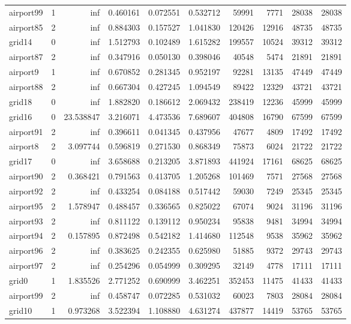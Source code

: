 \documentclass[../../../thesis.tex]{subfiles}
\begin{document}
\begin{longtable}{|l|r|r|r|r|r|r|r|r|r|}
airport99 & 1 & inf & 0.460161 & 0.072551 & 0.532712 & 59991 & 7771 & 28038 & 28038 \\
airport85 & 2 & inf & 0.884303 & 0.157527 & 1.041830 & 120426 & 12916 & 48735 & 48735 \\
grid14 & 0 & inf & 1.512793 & 0.102489 & 1.615282 & 199557 & 10524 & 39312 & 39312 \\
airport87 & 2 & inf & 0.347916 & 0.050130 & 0.398046 & 40548 & 5474 & 21891 & 21891 \\
airport9 & 1 & inf & 0.670852 & 0.281345 & 0.952197 & 92281 & 13135 & 47449 & 47449 \\
airport88 & 2 & inf & 0.667304 & 0.427245 & 1.094549 & 89422 & 12329 & 43721 & 43721 \\
grid18 & 0 & inf & 1.882820 & 0.186612 & 2.069432 & 238419 & 12236 & 45999 & 45999 \\
grid16 & 0 & 23.538847 & 3.216071 & 4.473536 & 7.689607 & 404808 & 16790 & 67599 & 67599 \\
airport91 & 2 & inf & 0.396611 & 0.041345 & 0.437956 & 47677 & 4809 & 17492 & 17492 \\
airport8 & 2 & 3.097744 & 0.596819 & 0.271530 & 0.868349 & 75873 & 6024 & 21722 & 21722 \\
grid17 & 0 & inf & 3.658688 & 0.213205 & 3.871893 & 441924 & 17161 & 68625 & 68625 \\
airport90 & 2 & 0.368421 & 0.791563 & 0.413705 & 1.205268 & 101469 & 7571 & 27568 & 27568 \\
airport92 & 2 & inf & 0.433254 & 0.084188 & 0.517442 & 59030 & 7249 & 25345 & 25345 \\
airport95 & 2 & 1.578947 & 0.488457 & 0.336565 & 0.825022 & 67074 & 9024 & 31196 & 31196 \\
airport93 & 2 & inf & 0.811122 & 0.139112 & 0.950234 & 95838 & 9481 & 34994 & 34994 \\
airport94 & 2 & 0.157895 & 0.872498 & 0.542182 & 1.414680 & 112548 & 9538 & 35962 & 35962 \\
airport96 & 2 & inf & 0.383625 & 0.242355 & 0.625980 & 51885 & 9372 & 29743 & 29743 \\
airport97 & 2 & inf & 0.254296 & 0.054999 & 0.309295 & 32149 & 4778 & 17111 & 17111 \\
grid0 & 1 & 1.835526 & 2.771252 & 0.690999 & 3.462251 & 352453 & 11475 & 41433 & 41433 \\
airport99 & 2 & inf & 0.458747 & 0.072285 & 0.531032 & 60023 & 7803 & 28084 & 28084 \\
grid10 & 1 & 0.973268 & 3.522394 & 1.108880 & 4.631274 & 437877 & 14419 & 53765 & 53765 \\

\end{longtable}
\end{document}
